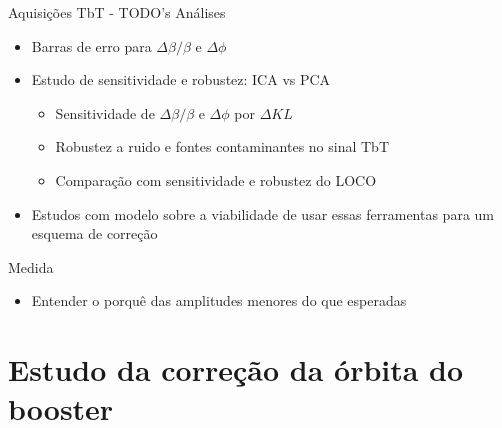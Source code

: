 \documentclass[aspectratio=169]{beamer}            %
\begin{document}
\begin{frame}{Aquisições TbT - TODO's}
Análises
    \begin{itemize}
        \setlength\itemsep{1em}
        \item Barras de erro para $\Delta \beta/\beta$ e $\Delta \phi$
        \item Estudo de sensitividade e robustez: ICA vs PCA 
        \begin{itemize}
            \item Sensitividade de $\Delta \beta / \beta$ e $\Delta \phi$ por $\Delta KL$
            \item Robustez a ruido e fontes contaminantes no sinal TbT
            \item Comparação com sensitividade e robustez do LOCO
        \end{itemize}
        \item Estudos com modelo sobre a viabilidade de usar essas ferramentas para um esquema de correção
    \end{itemize}
\vfill
Medida
    \begin{itemize}
        \setlength\itemsep{1em}
        \item Entender o porquê das amplitudes menores do que esperadas 
    \end{itemize}
\end{frame}




\section{Estudo da correção da órbita do booster}
\end{document}
